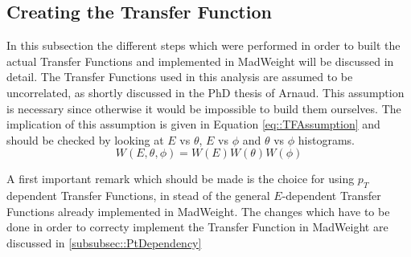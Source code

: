 \subsection{Creating the Transfer Function}
In this subsection the different steps which were performed in order to built the actual Transfer Functions and implemented in MadWeight will be discussed in detail. The Transfer Functions used in this analysis are assumed to be uncorrelated, as shortly discussed in the PhD thesis of Arnaud. This assumption is necessary since otherwise it would be impossible to build them ourselves. The implication of this assumption is given in Equation \ref{eq::TFAssumption} and should be checked by looking at $E$ vs $\theta$, $E$ vs $\phi$ and $\theta$ vs $\phi$ histograms.
\begin{equation} \label{eq::TFAssumption}
 W(E, \theta, \phi) = W(E) W(\theta) W(\phi)
\end{equation}

A first important remark which should be made is the choice for using $p_{T}$ dependent Transfer Functions, in stead of the general $E$-dependent Transfer Functions already implemented in MadWeight. The changes which have to be done in order to correcty implement the Transfer Function in MadWeight are discussed in \ref{subsubsec::PtDependency}

